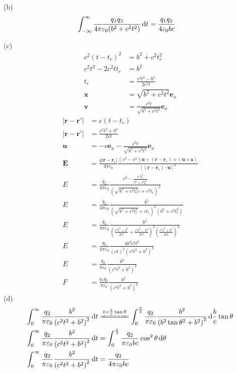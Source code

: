 (b)\begin{align*}
    \int_{-\infty}^{\infty}\frac{q_1q_2}{4\pi\varepsilon_0(b^2+c^2t^2)}\dif t&=\frac{q_1q_2}{4\varepsilon_0bc}
\end{align*}

(c)
\begin{align*}
    c^2(t-t_r)^2&=b^2+c^2t_r^2\\
    c^2t^2-2c^2tt_r&=b^2\\
    t_r&=\frac{c^2t^2-b^2}{2c^2t}\\
    \boldsymbol x&=\sqrt{b^2+c^2t^2}\boldsymbol e_x\\
    \boldsymbol v&=\frac{c^2t}{\sqrt{b^2+c^2t^2}}\boldsymbol e_x
\end{align*}
\begin{align*}
    \vert{}\boldsymbol{r} - \boldsymbol{r}'\vert{}&=c(t-t_r)\\
    \vert{}\boldsymbol{r} - \boldsymbol{r}'\vert{}&=\frac{c^2t^2+b^2}{2ct}\\
    \boldsymbol{u}&=-c\boldsymbol{e}_x-\frac{c^2t}{\sqrt{b^2+c^2t^2}}\boldsymbol e_x\\
    \boldsymbol{E}&=\frac{q\left|\boldsymbol{r}-\boldsymbol{r}_s\right|}{4\pi\varepsilon_0} \frac{\left(c^2-v^2\right)\boldsymbol{u}+\left(\boldsymbol{r}-\boldsymbol{r}_s\right)\times\left(\boldsymbol{u}\times\boldsymbol{a}\right)}{\left[(\boldsymbol{r}-\boldsymbol{r}_s)\cdot\boldsymbol{u}\right]^3}\\
    E&=\frac{q_2}{4\pi\varepsilon_0} \frac{c^2-\frac{c^4t_r^2}{b^2+c^2t_r^2}}{\left(\sqrt{b^2+c^2t_r^2}c+c^2t_r\right)^2}\\
    E&=\frac{q_2}{4\pi\varepsilon_0} \frac{b^2}{\left(\sqrt{b^2+c^2t_r^2}+ct_r\right)^2\left(b^2+c^2t_r^2\right)}\\
    E&=\frac{q_2}{4\pi\varepsilon_0} \frac{b^2}{\left(\frac{c^2t^2+b^2}{2ct}+\frac{c^2t^2-b^2}{2ct}\right)^2\left(\frac{c^2t^2+b^2}{2ct}\right)^2}\\
    E&=\frac{q_2}{4\pi\varepsilon_0} \frac{4b^2c^2t^2}{\left(ct\right)^2\left(c^2t^2+b^2\right)^2}\\
    E&=\frac{q_2}{\pi\varepsilon_0} \frac{b^2}{\left(c^2t^2+b^2\right)^2}\\
    F&=\frac{q_1q_2}{\pi\varepsilon_0} \frac{b^2}{\left(c^2t^2+b^2\right)^2}
\end{align*}
(d)
\begin{align*}
    \int_{0}^{\infty}\frac{q_2}{\pi\varepsilon_0} \frac{b^2}{\left(c^2t^2+b^2\right)^2}\dif t&\xlongequal{t=\frac{b}{c}\tan\theta}\int_{0}^{\frac{\pi}{2}}\frac{q_2}{\pi\varepsilon_0} \frac{b^2}{\left(b^2\tan\theta^2+b^2\right)^2}\dif \frac{b}{c}\tan\theta\\
    \int_{0}^{\infty}\frac{q_2}{\pi\varepsilon_0} \frac{b^2}{\left(c^2t^2+b^2\right)^2}\dif t&=\int_{0}^{\frac{\pi}{2}}\frac{q_2}{\pi\varepsilon_0bc} \cos^2\theta\dif \theta\\
    \int_{0}^{\infty}\frac{q_2}{\pi\varepsilon_0} \frac{b^2}{\left(c^2t^2+b^2\right)^2}\dif t&=\frac{q_2}{4\pi\varepsilon_0bc}
\end{align*}
